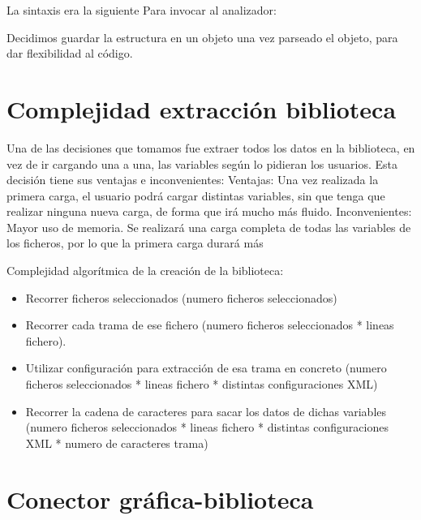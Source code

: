 La sintaxis era la siguiente \cite{DOMPARSER}
Para invocar al analizador:





Decidimos guardar la estructura en un objeto una vez parseado el objeto, para dar flexibilidad al código.











\section{Complejidad extracción biblioteca}

Una de las decisiones que tomamos fue extraer todos los datos en la biblioteca, en vez de ir cargando una a una, las variables según lo pidieran los usuarios.
Esta decisión tiene sus ventajas e inconvenientes:
Ventajas:
Una vez realizada la primera carga, el usuario podrá cargar distintas variables, sin que tenga que realizar ninguna nueva carga, de forma que irá mucho más fluido.
Inconvenientes:
Mayor uso de memoria.
Se realizará una carga completa de todas las variables de los ficheros, por lo que la primera carga durará más


Complejidad algorítmica de la creación de la biblioteca:

\begin{itemize}
	\item Recorrer ficheros seleccionados (numero ficheros seleccionados)
	\item Recorrer cada trama de ese fichero (numero ficheros seleccionados * lineas fichero).	
	\item Utilizar configuración para extracción de esa trama en concreto (numero ficheros seleccionados * lineas fichero * distintas configuraciones XML)
	
	\item Recorrer la cadena de caracteres para sacar los datos de dichas variables (numero ficheros seleccionados * lineas fichero * distintas configuraciones XML * numero de caracteres trama)

\end{itemize}


\section{Conector gráfica-biblioteca}

